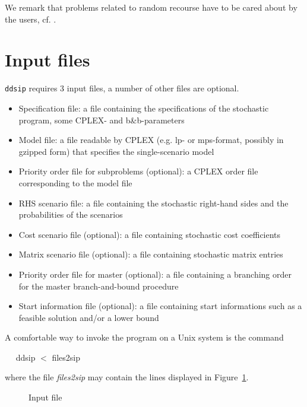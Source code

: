 \documentclass[11pt,draft]{article}
\newcommand{\+}{{\ti{+}}}
\newcommand{\1}{{\ti{1}}}
\begin{document}
We remark that problems related to random recourse have to be cared about by the users, cf. \cite{walk}.

\newpage
\section{Input files} \label{S:INP}

\texttt{ddsip} requires 3 input files, a number of other files are optional. 

\begin{itemize}
\item Specification file: a file containing the specifications of the
stochastic program, some CPLEX- and b\&b-parameters
\item Model file: a file readable by CPLEX (e.g. lp- or mps-format, possibly in gzipped form) that specifies the 
single-scenario model
\item Priority order file for subproblems (optional): a CPLEX order file corresponding to the
model file
\item RHS scenario file: a file containing the stochastic right-hand sides
and the probabilities of the scenarios 
\item Cost scenario file (optional): a file containing stochastic cost
coefficients 
\item Matrix scenario file (optional): a file containing stochastic
matrix entries
\item Priority order file for master (optional): a file containing a branching order for the master branch-and-bound
procedure  
\item Start information file (optional): a file containing start
informations such as a feasible solution and/or a lower bound
\end{itemize}
A comfortable way to invoke the program on a Unix system is the command 
\vspace{0.2cm}

\noindent
~~ ddsip $<$ files2sip
\vspace{0.2cm}

\noindent
where the file {\it files2sip} may contain the lines displayed in Figure~\ref{F:F2S}.
%
\begin{figure}[ht]
\begin{center}
\end{center} \caption{Input file} \label{F:F2S}
\end{figure}
%
\end{document}
